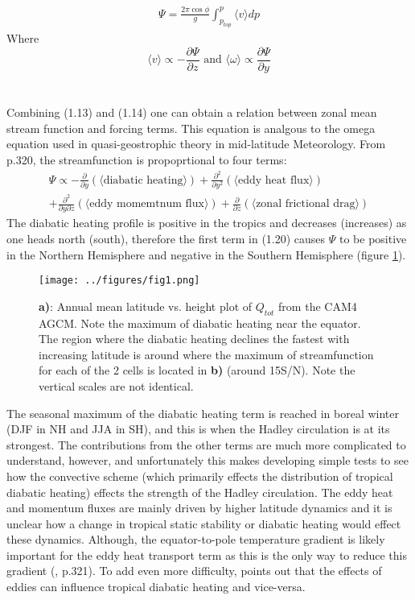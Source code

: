\documentclass[letterpaper,12pt,titlepage,oneside,final]{book}
\begin{document}
\begin{align}
\Psi=\frac{2\pi\cos{\phi}}{g}\int_{p_{top}}^{p} \langle{v}\rangle{dp}
\end{align}
Where
\begin{equation}\label{eq:test}
\langle{v}\rangle \propto -\frac{\partial{\Psi}}{\partial{z}} \text{ and } \langle{\omega}\rangle \propto\frac{\partial{\Psi}}{\partial{y}}
\end{equation}
\\
\\
Combining (1.13) and (1.14) one can obtain a relation between zonal mean stream function and forcing terms. This equation is analgous to the omega equation used in quasi-geostrophic theory in mid-latitude Meteorology. From \citep{holton_introduction_2004} p.320, the streamfunction is propoprtional to four terms:
\begin{equation}
\begin{split}
\Psi \propto -\frac{\partial}{\partial{y}}(\langle\text{diabatic heating}\rangle) + \frac{\partial^{2}}{\partial{y^{2}}}(\langle\text{eddy heat flux}\rangle) \\ + \frac{\partial^{2}}{\partial{y}\partial{z}}(\langle\text{eddy momemtnum flux}\rangle) + \frac{\partial}{\partial{z}}(\langle\text{zonal frictional drag}\rangle) 
\end{split}
\end{equation}
The diabatic heating profile is positive in the tropics and decreases (increases) as one heads north (south), therefore the first term in (1.20) causes $\Psi$ to be positive in the Northern Hemisphere and negative in the Southern Hemisphere (figure \ref{fig:HC}).

\begin{figure}[H]
\centering
\noindent\texttt{[image: ../figures/fig1.png]}\hfill
\caption{\textbf{a)}: Annual mean latitude vs. height plot of $Q_{tot}$ from the CAM4 AGCM. Note the maximum of diabatic heating near the equator. The region where the diabatic heating declines the fastest with increasing latitude is around where the maximum of streamfunction for each of the 2 cells is located in \textbf{b)} (around 15S/N). Note the vertical scales are not identical.}
\label{fig:HC}
\end{figure}

The seasonal maximum of the diabatic heating term is reached in boreal winter (DJF in NH and JJA in SH), and this is when the Hadley circulation is at its strongest. The contributions from the other terms are much more complicated to understand, however, and unfortunately this makes developing simple tests to see how the convective scheme (which primarily effects the distribution of tropical diabatic heating) effects the strength of the Hadley circulation. The eddy heat and momentum fluxes are mainly driven by higher latitude dynamics and it is unclear how a change in tropical static stability or diabatic heating would effect these dynamics. Although, the equator-to-pole temperature gradient is likely important for the eddy heat transport term as this is the only way to reduce this gradient (\citep{holton_introduction_2004}, p.321). To add even more difficulty, \citep{kim_hadley_2001} points out that the effects of eddies can influence tropical diabatic heating and vice-versa.
\end{document}
